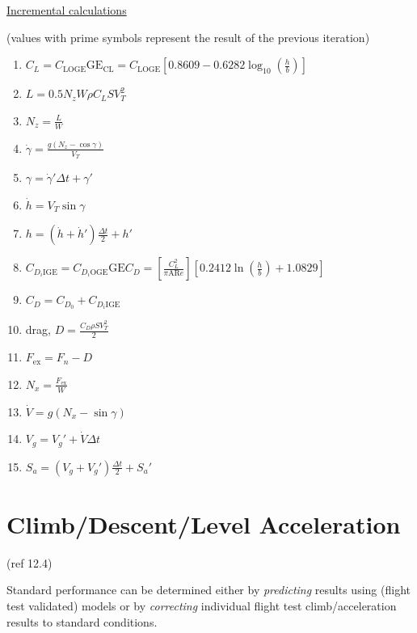 \documentclass[
]{book}
\providecommand{\tightlist}{%
  \setlength{\itemsep}{0pt}\setlength{\parskip}{0pt}}
\begin{document}
\underline{Incremental calculations}

(values with prime symbols represent the result of the previous iteration)

\begin{enumerate}
\def\labelenumi{\arabic{enumi}.}
\tightlist
\item
  \(C_L = C_{\mathrm{LOGE}} \mathrm{GE}_{\mathrm{CL}} = C_{\mathrm{LOGE}} \left[0.8609 - 0.6282 \log_{10} \left( \frac{h}{b} \right) \right]\)
\item
  \(L = 0.5 N_z W \rho C_L S V_T^2\)
\item
  \(N_z = \frac{L}{W}\)
\item
  \(\dot{\gamma} = \frac{g \left(N_z - \cos \gamma \right)}{V_T}\)
\item
  \(\gamma = \dot{\gamma}' \Delta t + \gamma'\)
\item
  \(\dot{h} = V_T \sin \gamma\)
\item
  \(h = \left( \dot{h} + \dot{h}' \right) \frac{\Delta t}{2} + h'\)
\item
  \(C_{D_i \mathrm{IGE}} = C_{D_i \mathrm{OGE}} \mathrm{GE}{C_D} = \left[ \frac{C_L^2}{\pi \mathrm{AR} e} \right] \left[0.2412 \ln \left( \frac{h}{b} \right) + 1.0829 \right]\)
\item
  \(C_D = C_{D_0} + C_{D_i \mathrm{IGE}}\)
\item
  drag, \(D = \frac{C_D \rho S V_T^2}{2}\)
\item
  \(F_{\text{ex}} = F_n - D\)
\item
  \(N_x = \frac{F_{\text{ex}}}{W}\)
\item
  \(\dot{V} = g \left( N_x - \sin \gamma \right)\)
\item
  \(V_g = V_g' + \dot{V} \Delta t\)
\item
  \(S_a = \left(V_g + V_g' \right) \frac{\Delta t}{2} + S_a'\)
\end{enumerate}

\hypertarget{climbdescentlevel-acceleration}{%
\section{Climb/Descent/Level Acceleration}\label{climbdescentlevel-acceleration}}

(ref 12.4)

Standard performance can be determined either by \emph{predicting} results using
(flight test validated) models or by \emph{correcting} individual flight test
climb/acceleration results to standard conditions.
\end{document}
